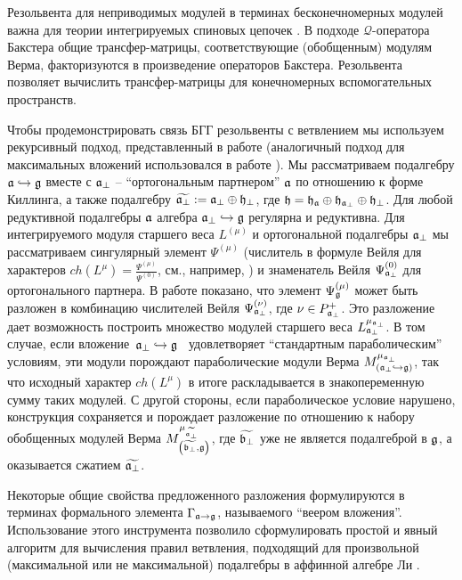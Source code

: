 Резольвента для неприводимых модулей в терминах бесконечномерных модулей важна для теории интегрируемых спиновых цепочек \cite{derk1008}. В подходе  $\mathcal{Q}$-оператора Бакстера \cite{derk09} общие трансфер-матрицы, соответствующие (обобщенным) модулям Верма, факторизуются в произведение операторов Бакстера. Резольвента позволяет вычислить трансфер-матрицы для конечномерных вспомогательных пространств.

Чтобы продемонстрировать связь БГГ резольвенты с ветвлением мы используем рекурсивный подход, представленный в работе \cite
{2010arXiv1007.0318L} (аналогичный подход для максимальных вложений использовался в работе \cite{ilyin812pbc}). Мы рассматриваем подалгебру $\mathfrak{a} \hookrightarrow \mathfrak{g}$ вместе с $\mathfrak{a}_{\bot}$ -- ``ортогональным партнером'' $\mathfrak{a}$ по отношению к форме Киллинга, а также подалгебру $\widetilde{\mathfrak{a}_{\bot}}:=\mathfrak{a}_{\bot}\oplus \frak{h}_{\perp }$, где $\frak{h}=\frak{\frak{h}_{\mathfrak{a}}}\oplus
\frak{h}_{\mathfrak{a}_{\bot}}\oplus \frak{h}_{\perp }$. Для любой редуктивной подалгебры $\mathfrak{a}$ алгебра $\mathfrak{a}_{\bot}\hookrightarrow \mathfrak{g}$ регулярна и редуктивна. Для интегрируемого модуля старшего веса $%
L^{\left(\mu \right) }$ и ортогональной подалгебры  $\mathfrak{a}_{\bot }$ мы рассматриваем сингулярный элемент $\Psi ^{\left( \mu \right) }$ (числитель в формуле Вейля для характеров $ch\left( L^{\mu }\right) =\frac{\Psi ^{\left(
\mu \right) }}{\Psi ^{\left( 0\right) }}$, см., например,  \cite
{humphreys1997introduction}) и знаменатель Вейля $\Psi _{\mathfrak{a}_{\bot
  }}^{\left( 0\right) }$ для ортогонального партнера. В работе показано, что элемент  $\Psi _{\gf%
}^{\left( \mu \right) }$ может быть разложен в комбинацию числителей Вейля $\Psi _{\mathfrak{a}_{\bot }}^{\left( \nu \right) }$, где $\nu \in P_{%
\mathfrak{a}_{\bot}}^{+}$. Это разложение дает возможность построить множество модулей старшего веса $L_{\afb}%
^{\mu _{\afb}}$. В том случае, если вложение\ $\af%
_{\bot }\hookrightarrow \gf$ \ удовлетворяет ``стандартным параболическим'' условиям, эти модули порождают параболические модули Верма $M_{\left(
\afb \hookrightarrow \gf\right) }^{\mu _{%
\afb}}$, так что исходный характер $ch\left(
L^{\mu }\right) $ в итоге раскладывается в знакопеременную сумму таких модулей. С другой стороны, если параболическое условие нарушено, конструкция сохраняется и порождает разложение по отношению к набору обобщенных модулей Верма  $M_{\left( \widetilde{\frak{b}_{\perp }},\gf\right) }^{\mu _{%
\widetilde{\afb}}}$, где $%
\widetilde{\frak{b}_{\perp }}$ уже не является подалгеброй в $\mathfrak{g}$, а оказывается сжатием $\widetilde{\mathfrak{a}_{\bot}}$.

Некоторые общие свойства предложенного разложения формулируются в терминах  формального элемента $\Gamma _{\mathfrak{a}\rightarrow \mathfrak{g}}$, называемого ``веером вложения''. Использование этого инструмента позволило сформулировать простой и явный алгоритм для вычисления правил ветвления, подходящий для произвольной (максимальной или не максимальной) подалгебры в аффинной алгебре Ли \cite{2010arXiv1007.0318L}.

